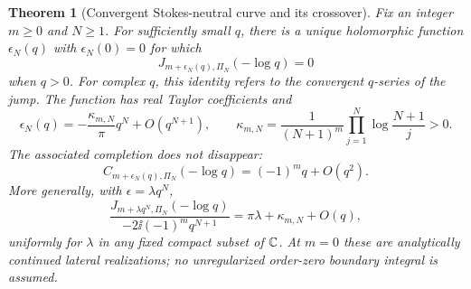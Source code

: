 \documentclass[11pt,a4paper]{article}
\numberwithin{equation}{section}
\newtheorem{theorem}{Theorem}[section]
\theoremstyle{definition}\newtheorem{definition}[theorem]{Definition}
\theoremstyle{remark}\newtheorem{remark}[theorem]{Remark}
\begin{document}
\begin{theorem}[Convergent Stokes-neutral curve and its crossover]
\label{ojf:thm:neutral}
Fix an integer $m\ge0$ and $N\ge1$. For sufficiently small $q$, there
is a unique holomorphic function $\epsilon_N(q)$ with
$\epsilon_N(0)=0$ for which
\begin{equation}\label{ojf:eq:neutral-identity}
 J_{m+\epsilon_N(q),\Pi_N}(-\log q)=0
\end{equation}
when $q>0$. For complex $q$, this identity refers to the convergent
$q$-series of the jump. The function has real Taylor coefficients and
\begin{equation}\label{ojf:eq:neutral-leading}
 \epsilon_N(q)=-\frac{\kappa_{m,N}}\pi q^N+O(q^{N+1}),\qquad
 \kappa_{m,N}=\frac1{(N+1)^m}
                 \prod_{j=1}^N\log\frac{N+1}{j}>0.
\end{equation}
The associated completion does \emph{not} disappear:
\begin{equation}\label{ojf:eq:neutral-completion}
 C_{m+\epsilon_N(q),\Pi_N}(-\log q)
                  =(-1)^m q+O(q^2).
\end{equation}
More generally, with $\epsilon=\lambda q^N$,
\begin{equation}\label{ojf:eq:crossover}
 \frac{J_{m+\lambda q^N,\Pi_N}(-\log q)}
                   {-2\ii(-1)^m q^{N+1}}
       =\pi\lambda+\kappa_{m,N}+O(q),
\end{equation}
uniformly for $\lambda$ in any fixed compact subset of $\mathbb C$.
At $m=0$ these are analytically continued lateral realizations; no
unregularized order-zero boundary integral is assumed.
\end{theorem}
\end{document}
